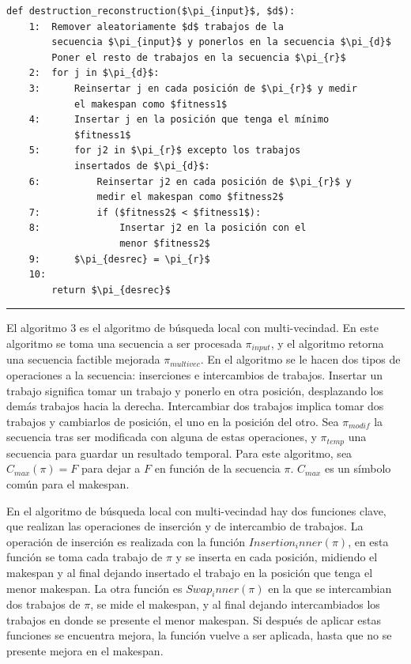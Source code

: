 \documentclass{article}
\begin{document}
\begin{lstlisting}[mathescape=true]
    def destruction_reconstruction($\pi_{input}$, $d$):
    1:  Remover aleatoriamente $d$ trabajos de la
        secuencia $\pi_{input}$ y ponerlos en la secuencia $\pi_{d}$
        Poner el resto de trabajos en la secuencia $\pi_{r}$
    2:  for j in $\pi_{d}$:
    3:      Reinsertar j en cada posición de $\pi_{r}$ y medir
            el makespan como $fitness1$
    4:      Insertar j en la posición que tenga el mínimo 
            $fitness1$
    5:      for j2 in $\pi_{r}$ excepto los trabajos
            insertados de $\pi_{d}$:
    6:          Reinsertar j2 en cada posición de $\pi_{r}$ y 
                medir el makespan como $fitness2$
    7:          if ($fitness2$ < $fitness1$):
    8:              Insertar j2 en la posición con el 
                    menor $fitness2$
    9:      $\pi_{desrec} = \pi_{r}$
    10:
        return $\pi_{desrec}$
\end{lstlisting}

\noindent\noindent
\rule{\linewidth}{0.4pt}

\vspace{\baselineskip}
El algoritmo 3 es el algoritmo de búsqueda local con multi-vecindad. En este algoritmo se toma una secuencia a ser procesada $\pi_{input}$, y el algoritmo retorna una secuencia factible mejorada $\pi_{multivec}$. En el algoritmo se le hacen dos tipos de operaciones a la secuencia: inserciones e intercambios de trabajos. Insertar un trabajo significa tomar un trabajo y ponerlo en otra posición, desplazando los demás trabajos hacia la derecha. Intercambiar dos trabajos implica tomar dos trabajos y cambiarlos de posición, el uno en la posición del otro. Sea $\pi_{modif}$ la secuencia tras ser modificada con alguna de estas operaciones, y $\pi_{temp}$ una secuencia para guardar un resultado temporal. Para este algoritmo, sea $C_{max}(\pi) = F$ para dejar a $F$ en función de la secuencia $\pi$. $C_{max}$ es un símbolo común para el makespan. \autocite{algMNIG}

\vspace{\baselineskip}
En el algoritmo de búsqueda local con multi-vecindad hay dos funciones clave, que realizan las operaciones de inserción y de intercambio de trabajos. La operación de inserción es realizada con la función $Insertion_inner(\pi)$, en esta función se toma cada trabajo de $\pi$ y se inserta en cada posición, midiendo el makespan y al final dejando insertado el trabajo en la posición que tenga el menor makespan. La otra función es $Swap_inner(\pi)$ en la que se intercambian dos trabajos de $\pi$, se mide el makespan, y al final dejando intercambiados los trabajos en donde se presente el menor makespan. Si después de aplicar estas funciones se encuentra mejora, la función vuelve a ser aplicada, hasta que no se presente mejora en el makespan. \autocite{algMNIG}
\end{document}
